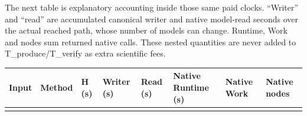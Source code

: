 \documentclass[
  american,
  11pt,
]{article}
\newcounter{none} %
\begin{document}
\begin{landscape}

The next table is explanatory accounting inside those same paid clocks.
``Writer'' and ``read'' are accumulated canonical writer and native
model-read seconds over the actual reached path, whose number of models
can change. Runtime, Work and nodes sum returned native calls. These
nested quantities are never added to T\_\allowbreak{}produce/T\_\allowbreak{}verify as extra
scientific fees.

{\def\LTcaptype{none} %
\begin{longtable}[]{@{}
  >{\raggedright\arraybackslash}p{}
  >{\raggedright\arraybackslash}p{}
  >{\raggedright\arraybackslash}p{}
  >{\raggedright\arraybackslash}p{}
  >{\raggedright\arraybackslash}p{}
  >{\raggedright\arraybackslash}p{}
  >{\raggedright\arraybackslash}p{}
  >{\raggedright\arraybackslash}p{}@{}}
\toprule\noalign{}
\begin{minipage}[b]{\linewidth}\raggedright
Input
\end{minipage} & \begin{minipage}[b]{\linewidth}\raggedright
Method
\end{minipage} & \begin{minipage}[b]{\linewidth}\raggedright
H (s)
\end{minipage} & \begin{minipage}[b]{\linewidth}\raggedright
Writer (s)
\end{minipage} & \begin{minipage}[b]{\linewidth}\raggedright
Read (s)
\end{minipage} & \begin{minipage}[b]{\linewidth}\raggedright
Native Runtime (s)
\end{minipage} & \begin{minipage}[b]{\linewidth}\raggedright
Native Work
\end{minipage} & \begin{minipage}[b]{\linewidth}\raggedright
Native nodes
\end{minipage} \\
\midrule\noalign{}
\endhead
\bottomrule\noalign{}

\end{longtable}}
\end{landscape}
\end{document}
